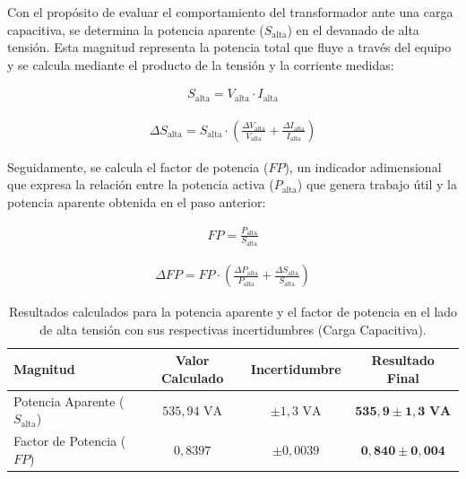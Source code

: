 Con el propósito de evaluar el comportamiento del transformador ante una carga capacitiva, se determina la potencia aparente ($S_{\text{alta}}$) en el devanado de alta tensión. Esta magnitud representa la potencia total que fluye a través del equipo y se calcula mediante el producto de la tensión y la corriente medidas:

\begin{align}
    S_{\text{alta}} = V_{\text{alta}} \cdot I_{\text{alta}} \label{eq:s_alta}
\end{align}

\begin{align}
    \Delta S_{\text{alta}} = S_{\text{alta}} \cdot \left( \frac{\Delta V_{\text{alta}}}{V_{\text{alta}}} + \frac{\Delta I_{\text{alta}}}{I_{\text{alta}}} \right) \label{eq:delta_s_alta}
\end{align}

Seguidamente, se calcula el factor de potencia ($FP$), un indicador adimensional que expresa la relación entre la potencia activa ($P_{\text{alta}}$) que genera trabajo útil y la potencia aparente obtenida en el paso anterior:

\begin{align}
    FP = \frac{P_{\text{alta}}}{S_{\text{alta}}} \label{eq:fp}
\end{align}

\begin{align}
    \Delta FP = FP \cdot \left( \frac{\Delta P_{\text{alta}}}{P_{\text{alta}}} + \frac{\Delta S_{\text{alta}}}{S_{\text{alta}}} \right) \label{eq:delta_fp}
\end{align}

\begin{table}[H]
\centering
\caption{Resultados calculados para la potencia aparente y el factor de potencia en el lado de alta tensión con sus respectivas incertidumbres (Carga Capacitiva).}
\label{tab:resultados_alta_tension}
\vspace{0.2cm}
\begin{tabular}{l c c c}
\toprule
\textbf{Magnitud} & \textbf{Valor Calculado} & \textbf{Incertidumbre} & \textbf{Resultado Final} \\
\midrule
Potencia Aparente ($S_{\text{alta}}$) & $535,94 \text{ VA}$ & $\pm 1,3 \text{ VA}$ & $\mathbf{535,9 \pm 1,3 \text{ VA}}$ \\
Factor de Potencia ($FP$)             & $0,8397$              & $\pm 0,0039$         & $\mathbf{0,840 \pm 0,004}$ \\
\bottomrule
\end{tabular}
\end{table}

